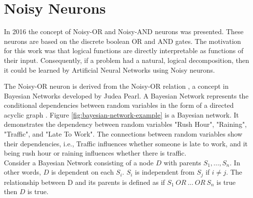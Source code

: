 \section{Noisy Neurons} \label{sec:background-noisy-neurons}
In 2016 the concept of Noisy-OR and Noisy-AND neurons \cite{LearningLogicalActivations} was presented. These neurons are based on the discrete boolean OR and AND gates. The motivation for this work was that logical functions are directly interpretable as functions of their input. Consequently, if a problem had a natural, logical decomposition, then it could be learned by Artificial Neural Networks using Noisy neurons.

\noindent
\begin{minipage}[t]{0.6\textwidth}
\vspace{0px}
The Noisy-OR neuron is derived from the Noisy-OR relation \cite{russell1995modern}, a concept in Bayesian Networks developed by Judea Pearl. A Bayesian Network represents the conditional dependencies between random variables in the form of a directed acyclic graph \cite{neapolitan2004learning}. Figure \ref{fig:bayesian-network-example} is a Bayesian network. It demonstrates the dependency between random variables "Rush Hour", "Raining", "Traffic", and "Late To Work". The connections between random variables show their dependencies, i.e., Traffic influences whether someone is late to work, and it being rush hour or raining influences whether there is traffic.\\

Consider a Bayesian Network consisting of a node $D$ with parents $S_1,..., S_n$. In other words, $D$ is dependent on each $S_i$. $S_i$ is independent from $S_j$ if $i \neq j$. The relationship between D and its parents is defined as if $S_1\ OR\ ...\ OR\ S_n$ is true then $D$ is true.\\
\end{minipage}
\hspace{0.05\textwidth}
